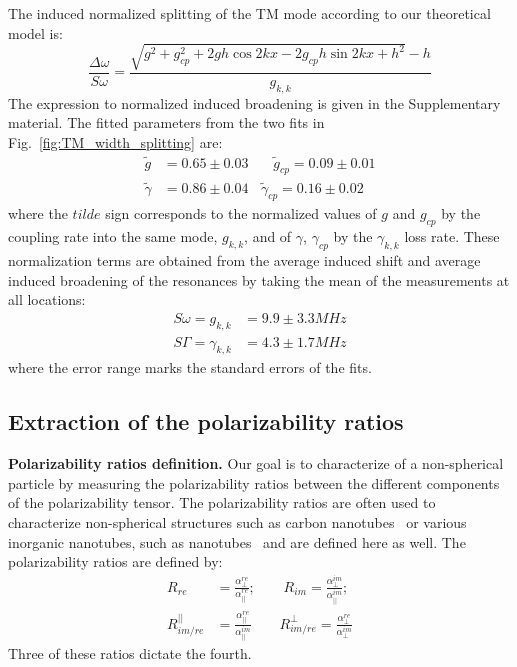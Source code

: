 \documentclass[journal=jacsat,manuscript=article]{achemso}
\begin{document}
The induced normalized splitting of the TM mode according to our theoretical model is:
\begin{equation}\label{eq:delta_omega_approxTM}
         \frac{\Delta \omega}{S\omega} = \frac{\sqrt{g^2 + g_{cp}^2 + 2 g h \cos{2 k x} - 2 g_{cp} h \sin{2 k x} + h^2}-h}{g_{k,k}}
\end{equation}
The expression to normalized induced broadening is given in the Supplementary material.
The fitted parameters from the two fits in Fig.~\ref{fig:TM_width_splitting} are:
\begin{equation}\label{eq:fitting_parameters}
  \begin{split}
     \tilde{g} &= 0.65 \pm 0.03 ~~~~~~~~      \tilde g_{cp} = 0.09 \pm 0.01\\
       \tilde {\gamma}&= 0.86 \pm 0.04 ~~~~   \tilde{\gamma}_{cp} = 0.16 \pm 0.02
   \end{split}
\end{equation}
where the $tilde$ sign corresponds to the normalized values of $g$ and $g_{cp}$ by the coupling rate into the same mode, $g_{k,k}$, and of $\gamma$, $\gamma_{cp}$ by the $\gamma_{k,k}$ loss rate. These normalization terms are obtained from the average induced shift and average induced broadening of the resonances by taking the mean of the measurements at all locations:
\begin{equation}\label{eq:dc_parameters}
  \begin{split}
     \textit{S}\omega=g_{k,k} &= 9.9 \pm 3.3 MHz   \\
      \textit{S}\Gamma=\gamma_{k,k} & = 4.3 \pm 1.7 MHz
  \end{split}
\end{equation}
where the error range marks the standard errors of the fits.

\subsection{Extraction of the polarizability ratios}

\textbf{Polarizability ratios definition.} Our goal is to characterize of a non-spherical particle by measuring the polarizability ratios between the different components of the polarizability tensor. The polarizability ratios are often used to characterize non-spherical structures such as carbon nanotubes~\cite{rao2000polarized,reich2000comment,wang2004receiving} or various inorganic nanotubes, such as  nanotubes~\cite{tenne2005orientation,yang2008phototransistors} and are defined here as well. The polarizability ratios are defined by:
\begin{equation}\label{ratio_definitions}
\begin{split}
   R_{re}  &= \frac{\alpha^{re}_{\perp}}{\alpha^{re}_{||}}; ~~~~~~~~~
    R_{im}  = \frac{\alpha^{im}_{\perp}}{\alpha^{im}_{||}}; \\
    R_{im/re}^{||}  &= \frac{\alpha^{re}_{||}}{\alpha^{im}_{||}} ~~~~~~~~~
    R_{im/re}^{\perp}  = \frac{\alpha^{re}_{\perp}}{\alpha^{im}_{\perp}}
\end{split}
\end{equation}
Three of these ratios dictate the fourth.
\end{document}
